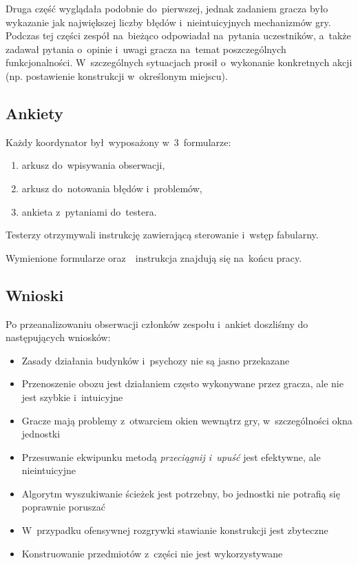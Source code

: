\documentclass[licencjacka]{pracamgr}
\begin{document}
      Druga część wyglądała podobnie do~pierwszej, jednak zadaniem gracza było wykazanie
      jak największej liczby błędów i~nieintuicyjnych mechanizmów gry.
      Podczas tej części zespół na~bieżąco odpowiadał na~pytania uczestników,
      a~także zadawał pytania o~opinie i~uwagi gracza na~temat poszczególnych funkcjonalności.
      W~szczególnych sytuacjach prosił o~wykonanie konkretnych akcji (np. postawienie konstrukcji w~określonym miejscu).

    \subsection{Ankiety}
      Każdy koordynator był~wyposażony w~3~formularze:
      \begin{enumerate}
	\item arkusz do~wpisywania obserwacji,
	\item arkusz do~notowania błędów i~problemów,
	\item ankieta z~pytaniami do~testera.
      \end{enumerate}
      Testerzy otrzymywali instrukcję zawierającą sterowanie i~wstęp fabularny.

      \noindent
      Wymienione formularze oraz~~instrukcja znajdują się na~końcu pracy.

    \subsection{Wnioski}
      Po przeanalizowaniu obserwacji członków zespołu i~ankiet doszliśmy do następujących wniosków:
      \begin{itemize}
	\item Zasady działania budynków i~psychozy nie są jasno przekazane
	\item Przenoszenie obozu jest działaniem często wykonywane przez gracza, ale nie jest szybkie i~intuicyjne
	\item Gracze mają problemy z~otwarciem okien wewnątrz gry, w~szczególności okna jednostki
	\item Przesuwanie ekwipunku metodą \emph{przeciągnij i~upuść} jest efektywne, ale nieintuicyjne
	\item Algorytm wyszukiwanie ścieżek jest potrzebny, bo jednostki nie potrafią się poprawnie poruszać
	\item W~przypadku ofensywnej rozgrywki stawianie konstrukcji jest zbyteczne
	\item Konstruowanie przedmiotów z~części nie jest wykorzystywane
      \end{itemize}
\end{document}
